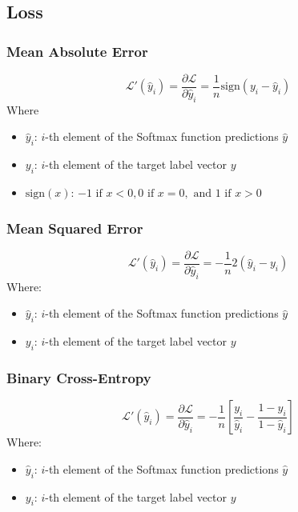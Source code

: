 \documentclass[a4paper]{article}
\newcommand{\haty}{\hat{y}}
\newcommand{\ELL}{\mathcal{L}}
\begin{document}
\subsection*{Loss}
\subsubsection*{Mean Absolute Error}
\begin{equation*}
    \ELL'(\haty_i) = \frac{\partial\ELL}{\partial \haty_i} = \frac{1}{n}\text{sign}(y_i-\haty_i)
\end{equation*}
Where 
\begin{itemize}
    \item $\haty_i$: $i$-th element of the Softmax function predictions $\haty$
    \item $y_i$: $i$-th element of the target label vector $y$
    \item $\text{sign}(x)$: $-1 \text{ if } x < 0, 0 \text{ if } x = 0, \text{ and } 1 \text{ if } x > 0$
\end{itemize}

\subsubsection*{Mean Squared Error}
\begin{equation*}
    \ELL'(\haty_i) = \frac{\partial\ELL}{\partial \haty_i} = -\frac{1}{n}2(\haty_i-y_i)
\end{equation*}
Where:
\begin{itemize}
    \item $\haty_i$: $i$-th element of the Softmax function predictions $\haty$
    \item $y_i$: $i$-th element of the target label vector $y$
\end{itemize}

\subsubsection*{Binary Cross-Entropy}
\begin{equation*}
    \ELL'(\haty_i) = \frac{\partial\ELL}{\partial \haty_i} = -\frac{1}{n}\left[ \frac{y_i}{\haty_i} - \frac{1-y_i}{1-\haty_i} \right]
\end{equation*}
Where:
\begin{itemize}
    \item $\haty_i$: $i$-th element of the Softmax function predictions $\haty$
    \item $y_i$: $i$-th element of the target label vector $y$
\end{itemize}
\end{document}
